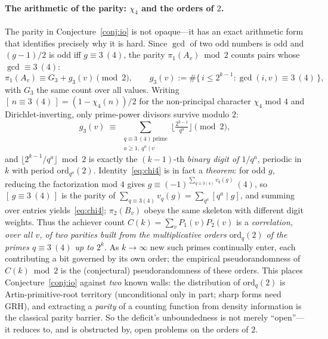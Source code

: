 \documentclass[11pt]{article}
\theoremstyle{remark}\newtheorem{remark}[theorem]{Remark}
\begin{document}
\paragraph{The arithmetic of the parity: $\chi_4$ and the orders of $2$.} The parity in
Conjecture~\ref{conj:io} is not opaque---it has an exact arithmetic form that identifies precisely why
it is hard. Since $\gcd$ of two odd numbers is odd and $(g-1)/2$ is odd iff $g\equiv3\ (4)$, the parity
$\pi_1(A_v)\bmod2$ counts pairs whose $\gcd\equiv3\ (4)$:
\[
   \pi_1(A_v)\equiv G_3+g_3(v)\pmod2,\qquad
   g_3(v):=\#\{\,i\le 2^{k-1}:\gcd(i,v)\equiv3\ (4)\,\},
\]
with $G_3$ the same count over all values. Writing $[\,n\equiv3\ (4)\,]=(1-\chi_4(n))/2$ for the
non-principal character $\chi_4$ mod $4$ and Dirichlet-inverting, only prime-power divisors survive
modulo $2$:
\begin{equation}\label{eq:chi4}
   g_3(v)\ \equiv\ \sum_{\substack{q\equiv3\ (4)\ \mathrm{prime}\\ a\ge1,\ q^a\mid v}}
      \Big\lfloor \tfrac{2^{k-1}}{q^a}\Big\rfloor \pmod 2 ,
\end{equation}
and $\lfloor 2^{k-1}/q^a\rfloor\bmod2$ is exactly the $(k{-}1)$-th \emph{binary digit of $1/q^a$},
periodic in $k$ with period $\mathrm{ord}_{q^a}(2)$. Identity~\eqref{eq:chi4} is in fact a
\emph{theorem}: for odd $g$, reducing the factorization mod $4$ gives
$g\equiv(-1)^{\sum_{q\equiv3(4)}v_q(g)}\ (4)$, so $[\,g\equiv3\ (4)\,]$ is the parity of
$\sum_{q\equiv3(4)}v_q(g)=\sum_{q^a}[q^a\mid g]$, and summing over entries yields~\eqref{eq:chi4};
$\pi_2(B_v)$ obeys the same skeleton with different digit weights. Thus the
achiever count $C(k)=\sum_v P_1(v)P_2(v)$ is a \emph{correlation, over all $v$, of two parities built
from the multiplicative orders $\mathrm{ord}_q(2)$ of the primes $q\equiv3\ (4)$ up to $2^k$}. As
$k\to\infty$ new such primes continually enter, each contributing a bit governed by its own order; the
empirical pseudorandomness of $C(k)\bmod2$ is the (conjectural) pseudorandomness of these orders. This
places Conjecture~\ref{conj:io} against \emph{two} known walls: the distribution of $\mathrm{ord}_q(2)$
is Artin-primitive-root territory (unconditional only in part; sharp forms need GRH), and extracting a
\emph{parity} of a counting function from density information is the classical parity barrier. So the
deficit's unboundedness is not merely ``open''---it reduces to, and is obstructed by, open problems on
the orders of $2$.
\end{document}
